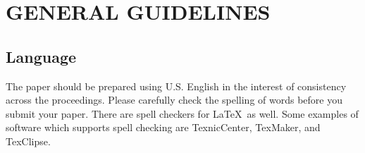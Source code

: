 \documentclass{article}
\begin{document}
%

\section{GENERAL GUIDELINES}

\subsection{Language}
The paper should be prepared using U.S. English in the interest of consistency across the proceedings. Please carefully check the spelling of words before you submit your paper. There are spell checkers for \LaTeX\ as well.
Some examples of software which supports spell checking are TexnicCenter, TexMaker, and TexClipse.
\end{document}

